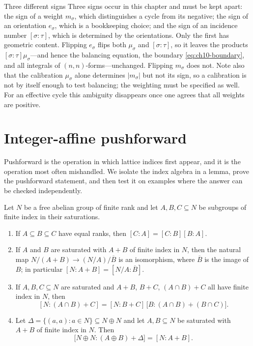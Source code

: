 \begin{warning}{Three different signs}
Three signs occur in this chapter and must be kept apart: the sign of a
weight $m_\sigma$, which distinguishes a cycle from its negative; the sign of
an orientation $e_\sigma$, which is a bookkeeping choice; and the sign of an
incidence number $[\sigma:\tau]$, which is determined by the orientations.
Only the first has geometric content.  Flipping $e_\sigma$ flips both
$\mu_\sigma$ and $[\sigma:\tau]$, so it leaves the products
$[\sigma:\tau]\mu_\sigma$---and hence the balancing equation, the boundary
\eqref{eq:ch10-boundary}, and all integrals of $(n,n)$-forms---unchanged.
Flipping $m_\sigma$ does not.  Note also that the calibration $\mu_\sigma$
alone determines $|m_\sigma|$ but not its sign, so a calibration is not by
itself enough to test balancing; the weighting must be specified as well.
For an effective cycle this ambiguity disappears once one agrees that all
weights are positive.
\end{warning}

\section{Integer-affine pushforward}
\label{sec:ch10-pushforward}

Pushforward is the operation in which lattice indices first appear, and it is
the operation most often mishandled.  We isolate the index algebra in a
lemma, prove the pushforward statement, and then test it on examples where
the answer can be checked independently.

\begin{lemma}
\label{lem:ch10-index}
Let $N$ be a free abelian group of finite rank and let $A,B,C\subseteq N$ be
subgroups of finite index in their saturations.
\begin{enumerate}
\item\label{itm:ch10-idx-tower} If $A\subseteq B\subseteq C$ have equal
      ranks, then $[C:A]=[C:B][B:A]$.
\item\label{itm:ch10-idx-quotient} If $A$ and $B$ are saturated with
      $A+B$ of finite index in $N$, then the natural map
      $N/(A+B)\to(N/A)/\overline B$ is an isomorphism, where $\overline B$ is
      the image of $B$; in particular
      $[N:A+B]=[N/A:\overline B]$.
\item\label{itm:ch10-idx-kernel-cokernel} If $A,B,C\subseteq N$ are saturated
      and $A+B$, $B+C$, $(A\cap B)+C$ all have finite index in $N$, then
      \[
       [N:(A\cap B)+C]
       =[N:B+C]\,\bigl[B:(A\cap B)+(B\cap C)\bigr].
      \]
\item\label{itm:ch10-idx-diagonal} Let $\Delta=\{(a,a):a\in N\}\subseteq
      N\oplus N$ and let $A,B\subseteq N$ be saturated with $A+B$ of finite
      index in $N$. Then
      \[
       \bigl[N\oplus N:(A\oplus B)+\Delta\bigr]=[N:A+B].
      \]
\end{enumerate}
\end{lemma}

